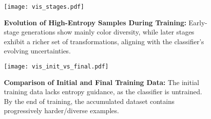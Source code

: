 \begin{figure}
    \centering
    \texttt{[image: vis\_stages.pdf]}
    \caption{\textbf{Evolution of High-Entropy Samples During Training:} Early-stage generations show mainly color diversity, while later stages exhibit a richer set of transformations, aligning with the classifier's evolving uncertainties.}
    \label{fig:vis_stages}
\end{figure}

\begin{figure}
    \centering
    \texttt{[image: vis\_init\_vs\_final.pdf]}
    \caption{\textbf{Comparison of Initial and Final Training Data:} The initial training data lacks entropy guidance, as the classifier is untrained. By the end of training, the accumulated dataset contains progressively harder/diverse examples.}
    \label{fig:vis_init_vs_final}
\end{figure}
